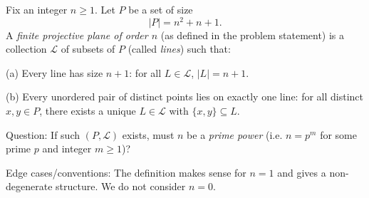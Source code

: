 Fix an integer $n\ge 1$. Let $P$ be a set of size
\[
|P| = n^2+n+1.
\]
A \emph{finite projective plane of order $n$} (as defined in the problem statement) is a collection $\mathcal L$ of subsets of $P$ (called \emph{lines}) such that:

(a) Every line has size $n+1$: for all $L\in\mathcal L$, $|L|=n+1$.

(b) Every unordered pair of distinct points lies on exactly one line: for all distinct $x,y\in P$, there exists a unique $L\in\mathcal L$ with $\{x,y\}\subseteq L$.

Question: If such $(P,\mathcal L)$ exists, must $n$ be a \emph{prime power} (i.e. $n=p^m$ for some prime $p$ and integer $m\ge 1$)?

Edge cases/conventions: The definition makes sense for $n=1$ and gives a non-degenerate structure. We do not consider $n=0$.
